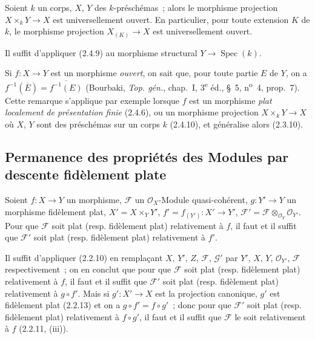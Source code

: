 \begin{corollary}[2.4.10]
\label{IV.2.4.10-fr}
Soient $k$ un corps, $X$, $Y$ des $k$-préschémas~; alors le morphisme
projection $X\times_k Y\to X$ est universellement ouvert. En particulier,
pour toute extension $K$ de $k$, le morphisme projection $X_{(K)}\to X$ est
universellement ouvert.
\end{corollary}

Il suffit d'appliquer (2.4.9) au morphisme structural
$Y\to\operatorname{Spec}(k)$.

\begin{remark}[2.4.11]
\label{IV.2.4.11-fr}
Si $f:X\to Y$ est un morphisme \emph{ouvert}, on sait que, pour toute partie
$E$ de $Y$, on a
$f^{-1}(\overline E)=\overline{f^{-1}(E)}$
(Bourbaki, \emph{Top. gén.}, chap.~I, 3\textsuperscript{e} éd., \S~5,
n\textsuperscript{o}~4, prop.~7). Cette remarque s'applique par exemple
lorsque $f$ est un morphisme \emph{plat localement de présentation finie}
(2.4.6), ou un morphisme projection $X\times_k Y\to X$ où $X$, $Y$ sont des
préschémas sur un corps $k$ (2.4.10), et généralise alors (2.3.10).
\end{remark}

\subsection{Permanence des propriétés des Modules par descente fidèlement plate}

\begin{proposition}[2.5.1]
\label{IV.2.5.1-fr}
Soient $f:X\to Y$ un morphisme, $\mathscr F$ un $\mathcal O_X$-Module
quasi-cohérent, $g:Y'\to Y$ un morphisme fidèlement plat,
$X'=X\times_Y Y'$, $f'=f_{(Y')}:X'\to Y'$,
$\mathscr F'=\mathscr F\otimes_{\mathcal O_Y}\mathcal O_{Y'}$. Pour que
$\mathscr F$ soit plat (resp. fidèlement plat) relativement à $f$, il faut et
il suffit que $\mathscr F'$ soit plat (resp. fidèlement plat) relativement à
$f'$.
\end{proposition}

Il suffit d'appliquer (2.2.10) en remplaçant $X$, $Y'$, $Z$, $\mathscr F$,
$\mathscr G'$ par $Y'$, $X$, $Y$, $\mathcal O_{Y'}$, $\mathscr F$
respectivement~; on en conclut que pour que $\mathscr F$ soit plat (resp.
fidèlement plat) relativement à $f$, il faut et il suffit que $\mathscr F'$
soit plat (resp. fidèlement plat) relativement à $g\circ f'$. Mais si
$g':X'\to X$ est la projection canonique, $g'$ est fidèlement plat (2.2.13)
et on a $g\circ f'=f\circ g'$~; donc pour que $\mathscr F'$ soit plat (resp.
fidèlement plat) relativement à $f\circ g'$, il faut et il suffit que
$\mathscr F$ le soit relativement à $f$ (2.2.11, (iii)).

